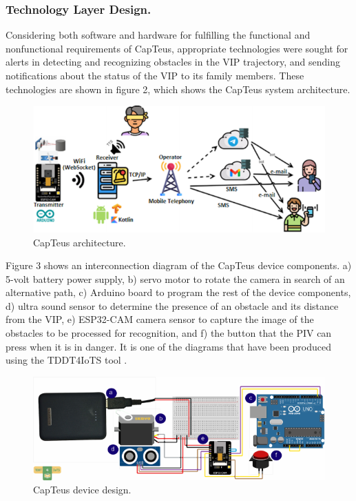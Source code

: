 \documentclass{svproc}
\begin{document}
\subsubsection{Technology Layer Design.} Considering both software and hardware for fulfilling the functional and nonfunctional requirements of CapTeus, appropriate technologies were sought for alerts in detecting and recognizing obstacles in the VIP trajectory, and sending notifications about the status of the VIP to its family members. These technologies are shown in figure 2, which shows the CapTeus system architecture.

\begin{figure}[h!]
	\includegraphics[scale=1.2]{fig2.pdf}
	\centering
	\caption{CapTeus architecture.}
	\label{fig:fig2}
\end{figure}

Figure 3 shows an interconnection diagram of the CapTeus device components.
a) 5-volt battery power supply, b) servo motor to rotate the camera in
search of an alternative path, c) Arduino board to program the rest of the device
components, d) ultra sound sensor to determine the presence of an obstacle and
its distance from the VIP, e) ESP32-CAM camera sensor to capture the image
of the obstacles to be processed for recognition, and f) the button that the PIV
can press when it is in danger. It is one of the diagrams that have been produced
using the TDDT4IoTS tool \cite{Guerrero-Ulloa2021}.

\begin{figure}[h!]
	\includegraphics[scale=1.1]{fig3.pdf}
	\centering
	\caption{CapTeus device design.}
	\label{fig:fig3}
\end{figure}
\end{document}
